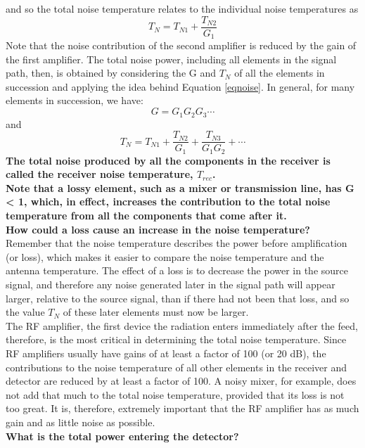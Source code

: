 \documentclass[10pt]{report}
\begin{document}
and so the total noise temperature relates to the individual noise temperatures as 
\begin{equation}\label{eqnoise}
T_N=T_{N1}+\frac{T_{N2}}{G_1}
\end{equation}
Note that the noise contribution of the second amplifier is reduced by the gain of the first amplifier. The total noise power, including all elements in the signal path, then, is obtained by considering the G and $T_N$ of all the elements in succession and applying the idea behind Equation \eqref{eqnoise}.  In general, for many elements in succession, we have: 
\begin{equation}
G=G_1G_2G_3\cdots
\end{equation}
and
\begin{equation}
T_N=T_{N1}+\frac{T_{N2}}{G_1}+\frac{T_{N3}}{G_1G_2}+\cdots
\end{equation}
\textbf{The total noise produced by all the components in the receiver is called the receiver noise temperature, $T_{rec}$. }\\
\textbf{Note that a lossy element, such as a mixer or transmission line, has G < 1, which, in effect, increases the contribution to the total noise temperature from all the components that come after it.}\\
\textbf{How could a loss cause an increase in the noise temperature? }\\
 Remember that the noise temperature describes the power before amplification (or loss), which makes it easier to compare the noise temperature and the antenna temperature.  The effect of a loss is to decrease the power in the source signal, and therefore any noise generated later in the signal path will appear larger, relative to the source signal, than if there had not been that loss, and so the value $T_N$ of these later elements must now be larger. \\
The RF amplifier, the first device the radiation enters immediately after the feed, therefore, is the most critical in determining the total noise temperature.  Since RF amplifiers usually have gains of at least a factor of 100 (or 20 dB), the contributions to the noise temperature of all other elements in the receiver and detector are reduced by at least a factor of 100.  A noisy mixer, for example, does not add that much to the total noise temperature, provided that its loss is not too great.  It is, therefore, extremely important that the RF amplifier has as much gain and as little noise as possible.\\
\textbf{What is the total power entering the detector?}\\
\end{document}
